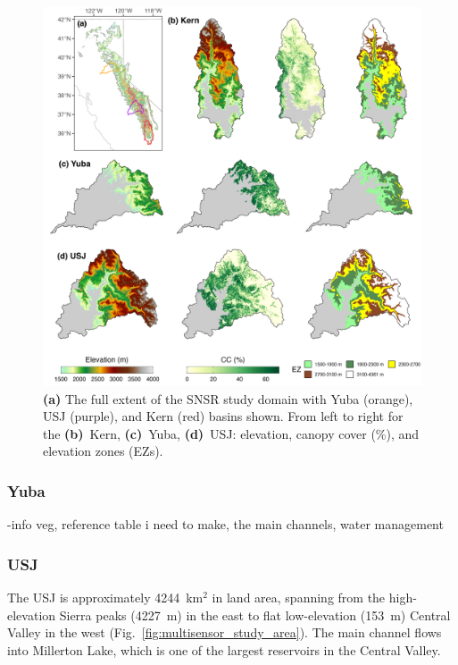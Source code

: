 \begin{figure}[t]
\centering
\includegraphics[width=14cm]{figures/ch2_figs/kuy_study_area_v2.png}
\caption{\textbf{(a)} The full extent of the SNSR study domain with Yuba (orange), USJ (purple), and Kern (red) basins shown. From left to right for the \textbf{(b)}~Kern, \textbf{(c)}~Yuba, \textbf{(d)}~USJ: elevation, canopy cover (\%), and elevation zones (EZs).}
\label{kuy_study_area}
\end{figure}
\hypertarget{ch2-sa-1}{\subsubsection{Yuba}\label{ch2-sa-1}}

-info veg, reference table i need to make, the main channels, water management

\hypertarget{ch2-sa-2}{\subsubsection{USJ}\label{ch2-sa-2}}

The USJ is approximately 4244~km$^{2}$ in land area, spanning from the high-elevation Sierra peaks (4227~m) in the east to flat low-elevation (153~m) Central Valley in the west (Fig.~\ref{fig:multisensor_study_area}). The main channel flows into Millerton Lake, which is one of the largest reservoirs in the Central Valley. 

